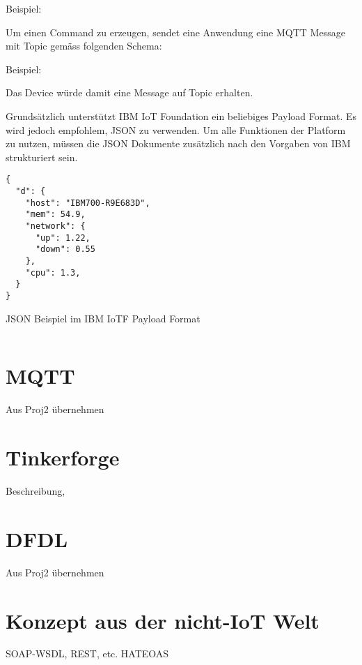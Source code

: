 Beispiel: 

Um einen Command zu erzeugen, sendet eine Anwendung eine MQTT Message mit Topic gemäss folgenden Schema:

Beispiel: 

Das Device  würde damit eine Message auf Topic  erhalten.


Grundsätzlich unterstützt IBM IoT Foundation ein beliebiges Payload Format. Es wird jedoch empfohlem, JSON zu verwenden. Um alle Funktionen der Platform zu nutzen, müssen die JSON Dokumente zusätzlich nach den Vorgaben von IBM strukturiert sein.

\begin{listing}[H]
\begin{verbatim}
{
  "d": {
    "host": "IBM700-R9E683D",
    "mem": 54.9,
    "network": {
      "up": 1.22,
      "down": 0.55
    },
    "cpu": 1.3,
  }
}
\end{verbatim}
\caption{JSON Beispiel im IBM IoTF Payload Format}
\label{json-example}
\end{listing}
\begin{verbatim}
\end{verbatim}



\section{MQTT}
Aus Proj2 übernehmen

\section{Tinkerforge}
Beschreibung,

\section{DFDL}
Aus Proj2 übernehmen






\section{Konzept aus der nicht-IoT Welt}
SOAP-WSDL, REST, etc.
HATEOAS
